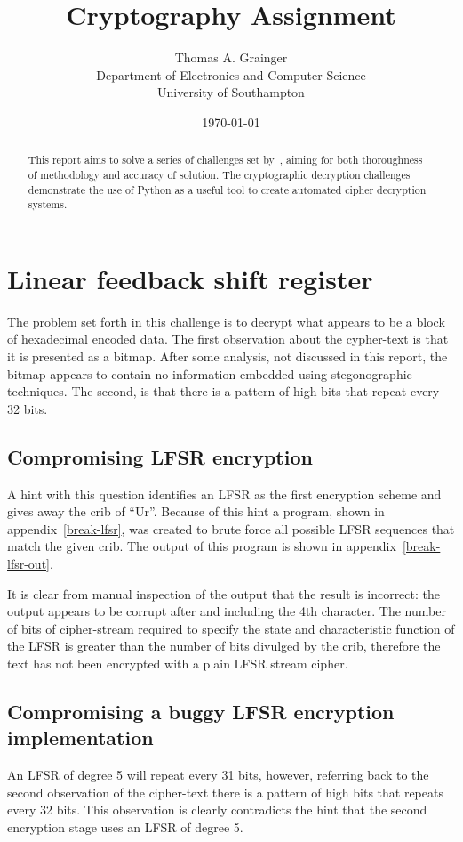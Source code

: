 \documentclass[pdftex, 12pt, a4paper]{article}
\title{Cryptography Assignment}
\author{
    Thomas A. Grainger \\
    Department of Electronics and Computer Science\\
    University of Southampton\\
}
\date{\today}
\begin{document}
\maketitle

\begin{abstract}
This report aims to solve a series of challenges set by~\textcite{instructions},
aiming for both thoroughness of methodology and accuracy of solution. The
cryptographic decryption challenges demonstrate the use of Python as a useful
tool to create automated cipher decryption systems.
\end{abstract}

\tableofcontents
\pagebreak
\section{Linear feedback shift register}
The problem set forth in this challenge is to decrypt what appears to be a block
of hexadecimal encoded data.  The first observation about the cypher-text is that it is presented as a bitmap.
After some analysis, not discussed in this report, the bitmap appears to
contain no information embedded using stegonographic techniques.  The second, is
that there is a pattern of high bits that repeat every 32 bits.

\subsection{Compromising LFSR encryption}
A hint with this question identifies an LFSR as the first encryption scheme and
gives away the crib of ``Ur''.  Because of this hint a program, shown in
appendix~\ref{break-lfsr}, was created to brute force all possible LFSR
sequences that match the given crib.  The output of this program is shown in
appendix~\ref{break-lfsr-out}.

It is clear from manual inspection of the output that the result is incorrect:
the output appears to be corrupt after and including the
4th character. The number of bits of cipher-stream required to specify the
state and characteristic function of the LFSR is greater than the number of
bits divulged by the crib, therefore the text has not been encrypted with a
plain LFSR stream cipher.

\subsection{Compromising a buggy LFSR encryption implementation}
An LFSR of degree 5 will repeat every 31 bits, however, referring back to the
second observation of the cipher-text there is a pattern of high bits that
repeats every 32 bits. This observation is clearly contradicts the hint that the
second encryption stage uses an LFSR of degree 5.
\end{document}

